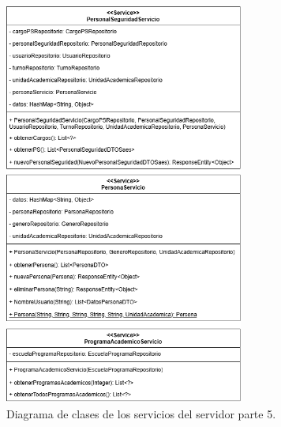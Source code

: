 \begin{figure}[htbp!]
	\begin{center}
		\includegraphics[width=0.7\textwidth]{Clases/Servicio5.png}
		\caption{Diagrama de clases de los servicios del servidor parte 5.}
		\label{fig:DS5}
	\end{center}
\end{figure}

